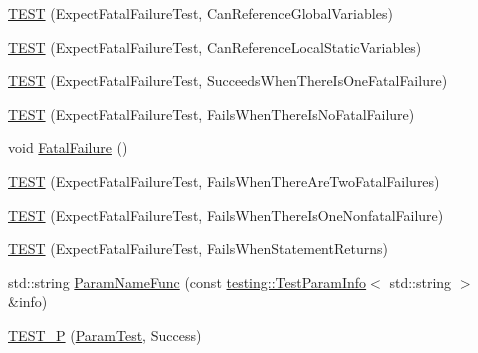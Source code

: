 \begin{DoxyCompactItemize}
\item 
\mbox{\hyperlink{_obj__test_2lib_2googletest-master_2googletest_2test_2googletest-output-test___8cc_a4b06191d54fb76270da3d3dd497e62b6}{T\+E\+ST}} (Expect\+Fatal\+Failure\+Test, Can\+Reference\+Global\+Variables)
\item 
\mbox{\hyperlink{_obj__test_2lib_2googletest-master_2googletest_2test_2googletest-output-test___8cc_ac6646aa5f6d4ea21c0528259118754a4}{T\+E\+ST}} (Expect\+Fatal\+Failure\+Test, Can\+Reference\+Local\+Static\+Variables)
\item 
\mbox{\hyperlink{_obj__test_2lib_2googletest-master_2googletest_2test_2googletest-output-test___8cc_a0d894cc9ae86412b4c156748602a23a7}{T\+E\+ST}} (Expect\+Fatal\+Failure\+Test, Succeeds\+When\+There\+Is\+One\+Fatal\+Failure)
\item 
\mbox{\hyperlink{_obj__test_2lib_2googletest-master_2googletest_2test_2googletest-output-test___8cc_af8e8545243605b2ba121e253ec48785e}{T\+E\+ST}} (Expect\+Fatal\+Failure\+Test, Fails\+When\+There\+Is\+No\+Fatal\+Failure)
\item 
void \mbox{\hyperlink{_obj__test_2lib_2googletest-master_2googletest_2test_2googletest-output-test___8cc_acdca9b16622e8a506a39240c8809af38}{Fatal\+Failure}} ()
\item 
\mbox{\hyperlink{_obj__test_2lib_2googletest-master_2googletest_2test_2googletest-output-test___8cc_a4fd11a245bf0e8eb46d78c8dc14c730e}{T\+E\+ST}} (Expect\+Fatal\+Failure\+Test, Fails\+When\+There\+Are\+Two\+Fatal\+Failures)
\item 
\mbox{\hyperlink{_obj__test_2lib_2googletest-master_2googletest_2test_2googletest-output-test___8cc_a35fafc42558ee14c42320b359c270026}{T\+E\+ST}} (Expect\+Fatal\+Failure\+Test, Fails\+When\+There\+Is\+One\+Nonfatal\+Failure)
\item 
\mbox{\hyperlink{_obj__test_2lib_2googletest-master_2googletest_2test_2googletest-output-test___8cc_aca5344af5eed2eefc512c555acbe5511}{T\+E\+ST}} (Expect\+Fatal\+Failure\+Test, Fails\+When\+Statement\+Returns)
\item 
std\+::string \mbox{\hyperlink{_obj__test_2lib_2googletest-master_2googletest_2test_2googletest-output-test___8cc_a61c686cb1c0f8f19c100ff975482ec7a}{Param\+Name\+Func}} (const \mbox{\hyperlink{structtesting_1_1_test_param_info}{testing\+::\+Test\+Param\+Info}}$<$ std\+::string $>$ \&info)
\item 
\mbox{\hyperlink{_obj__test_2lib_2googletest-master_2googletest_2test_2googletest-output-test___8cc_a4e7fc7682f9a8a168b78d53b05fab8bf}{T\+E\+S\+T\+\_\+P}} (\mbox{\hyperlink{class_param_test}{Param\+Test}}, Success)

\end{DoxyCompactItemize}

